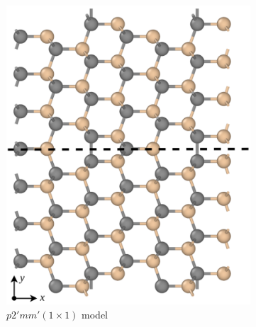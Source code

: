 \documentclass[%
preprint,
amsmath,amssymb,
aps,
]{revtex4-2}
\newcommand{\?}{\stackrel{?}{=}}
\begin{document}
\begin{figure}[h!]
\centering
\begin{subfigure}{0.3\textwidth}
 \includegraphics[width=\textwidth]{S3-1.png}
 \caption{$p2'mm' (1 \times 1)$ model}
 \label{Fig:S3-112-1}
\end{subfigure}
\hspace{2em}
\begin{subfigure}{0.3\textwidth}

\end{subfigure}
\end{figure}
\end{document}
